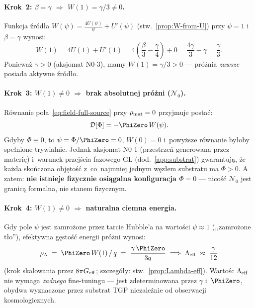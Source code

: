 \paragraph{Krok~2: $\beta = \gamma$ $\Rightarrow$ $W(1) = \gamma/3 \neq 0$.}
Funkcja \'zr\'od\l{}a $W(\psi) = \frac{4U(\psi)}{\psi} + U'(\psi)$
(stw.~\ref{prop:W-from-U}) przy $\psi = 1$ i~$\beta = \gamma$ wynosi:
\begin{equation}
  W(1) = 4U(1) + U'(1)
       = 4\!\left(\frac{\beta}{3} - \frac{\gamma}{4}\right) + 0
       = \frac{4\gamma}{3} - \gamma = \frac{\gamma}{3}.
\end{equation}
Poniewa\.z $\gamma > 0$ (aksjomat N0-3), mamy $W(1) = \gamma/3 > 0$
--- pr\'o\.znia \emph{zawsze} posiada aktywne \'zr\'od\l{}o.

\paragraph{Krok~3: $W(1)\neq 0$ $\Rightarrow$ brak absolutnej pr\'o\.zni ($\mathcal{N}_0$).}
R\'ownanie pola~\eqref{eq:field-full-source} przy $\rho_{\rm mat} = 0$ przyjmuje posta\'c:
\[
  \mathcal{D}[\Phi] = -\PhiZero\,W(\psi).
\]
Gdyby $\Phi \equiv 0$, to $\psi = \Phi/\PhiZero = 0$, $W(0) = 0$ i~powy\.zsze
r\'ownanie by\l{}oby spe\l{}nione trywialnie.
Jednak aksjomat N0-1 (przestrze\'n generowana przez materi\k{e}) i~warunek
przej\'scia fazowego GL (dod.~\ref{app:substrat}) gwarantuj\k{a},
\.ze ka\.zda sko\'nczona obj\k{e}to\'s\'c z~co~najmniej jednym w\k{e}z\l{}em
substratu ma $\Phi > 0$.
A zatem: \textbf{nie istnieje fizycznie osi\k{a}galna konfiguracja $\Phi = 0$}
--- nico\'s\'c $\mathcal{N}_0$ jest granic\k{a} formalna, nie stanem fizycznym.

\paragraph{Krok~4: $W(1)\neq 0$ $\Rightarrow$ naturalna ciemna energia.}
Gdy pole $\psi$ jest zamro\.zone przez tarcie Hubble'a na warto\'sci $\psi \approx 1$
(,,zamro\.zone t\l{}o''), efektywna g\k{e}sto\'s\'c energii pr\'o\.zni wynosi:
\begin{equation}\label{eq:Lambda-from-W1}
  \rho_\Lambda \;=\; \PhiZero\,W(1)\,/\,q
  \;=\; \frac{\gamma\,\PhiZero}{3q}
  \;\Longrightarrow\;
  \Lambda_{\rm eff} \;\approx\; \frac{\gamma}{12}
\end{equation}
(krok skalowania przez $8\pi G_{\rm eff}$; szczeg\'o\l{}y:
stw.~\ref{prop:Lambda-eff}).
Warto\'{sc} $\Lambda_{\rm eff}$ nie wymaga \emph{\.zadnego} fine-tuningu ---
jest zdeterminowana przez $\gamma$ i~$\PhiZero$, obydwa wyznaczone przez
substrat TGP niezale\.znie od obserwacji kosmologicznych.

